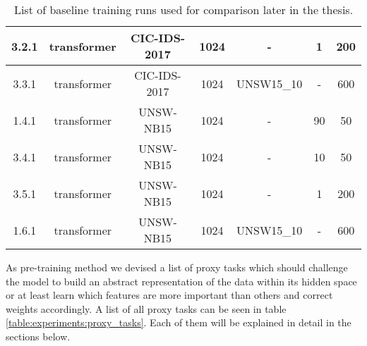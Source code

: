 \begin{table}[h]
{\begin{tabular}{c c c c c c c}
			3.2.1 \label{ex_1_2_3}           & transformer    & CIC-IDS-2017     & 1024                                     & -			& 1                    & 200                                           \\ \midrule
			3.3.1 \label{ex_1_2_4}           & transformer    & CIC-IDS-2017     & 1024                                     & UNSW15\_10	& -                    & 600                                           \\ \midrule
			1.4.1 \label{ex_1_2_5}           & transformer    & UNSW-NB15        & 1024                                     & -			& 90                   & 50                                            \\ \midrule
			3.4.1 \label{ex_1_2_6}           & transformer    & UNSW-NB15        & 1024                                     & -			& 10                   & 50                                            \\ \midrule
			3.5.1 \label{ex_1_2_7}           & transformer    & UNSW-NB15        & 1024                                     & -			& 1                    & 200                                           \\ \midrule
			1.6.1 \label{ex_1_2_8}           & transformer    & UNSW-NB15        & 1024                                     & UNSW15\_10	& -                    & 600                                           \\
	\end{tabular}}
	\caption{List of baseline training runs used for comparison later in the thesis.}
	\label{table:experiments:baseline}
\end{table}

As pre-training method we devised a list of proxy tasks which should challenge the model to build an abstract representation of the data within its hidden space or at least learn which features are more important than others and correct weights accordingly. A list of all proxy tasks can be seen in table \ref{table:experiments:proxy_tasks}. Each of them will be explained in detail in the sections below.

